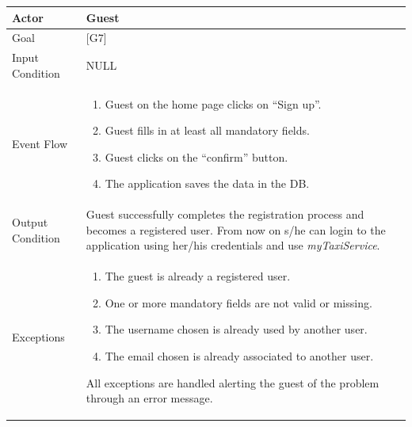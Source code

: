 \documentclass[a4paper,11pt]{report} %
\newcommand{\mts}{\mbox{\normalfont\itshape myTaxiService}}
\begin{document}
	\begin{center}
		\begin{tabular}{| l | p{9cm} |}\hline
			Actor & Guest\\\hline
			Goal & {[}G7{]} \\\hline
			Input Condition & NULL\\\hline
			Event Flow & \begin{enumerate}
							\item Guest on the home page clicks on ``Sign up''.
							\item Guest fills in at least all mandatory fields.
							\item Guest clicks on the ``confirm'' button.
							\item The application saves the data in the DB.
						 \end{enumerate}\\\hline
			Output Condition & Guest successfully completes the registration process and
								becomes a registered user. From now on s/he can login to
								the application using her/his credentials and use \mts{}.\\\hline
			Exceptions & {\begin{enumerate}
							\item The guest is already a registered user.
							\item One or more mandatory fields are not valid or missing.
							\item The username chosen is already used by another user.
							\item The email chosen is already associated to another user.
						  \end{enumerate} All exceptions are handled alerting the guest of the
						problem through an error message.}\\\hline
		\end{tabular}
	\end{center}


%	
	\pagebreak
\afterpage{}

	
\end{document}
